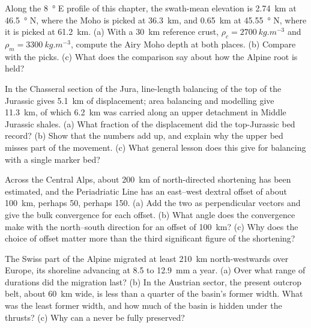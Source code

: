 \begin{exercise}[$\star\star$]\label{exo:b2:alpine-orogen:9}
Along the \qty{8}{\degree} E profile of this chapter, the swath-mean elevation is
\qty{2.74}{km} at \qty{46.5}{\degree} N, where the Moho is picked at \qty{36.3}{km}, and
\qty{0.65}{km} at \qty{45.55}{\degree} N, where it is picked at \qty{61.2}{km}. (a) With a
\qty{30}{km} reference crust, $\rho_c = \qty{2700}{kg.m^{-3}}$ and $\rho_m =
\qty{3300}{kg.m^{-3}}$, compute the Airy Moho depth at both places. (b) Compare with the
picks. (c) What does the comparison say about how the Alpine root is held?
\end{exercise}

\begin{exercise}[$\star\star\star$]\label{exo:b2:alpine-orogen:10}
In the Chasseral section of the Jura, line-length balancing of the top of the Jurassic
gives \qty{5.1}{km} of displacement; area balancing and modelling give \qty{11.3}{km}, of
which \qty{6.2}{km} was carried along an upper detachment in Middle Jurassic shales.
(a) What fraction of the displacement did the top-Jurassic bed record? (b) Show that the
numbers add up, and explain why the upper bed misses part of the movement. (c) What
general lesson does this give for balancing with a single marker bed?
\end{exercise}

\begin{exercise}[$\star\star\star$]\label{exo:b2:alpine-orogen:11}
Across the Central Alps, about \qty{200}{km} of north-directed shortening has been
estimated, and the Periadriatic Line has an east--west dextral offset of about
\qty{100}{km}, perhaps 50, perhaps 150. (a) Add the two as perpendicular vectors and give
the bulk convergence for each offset. (b) What angle does the convergence make with the
north--south direction for an offset of \qty{100}{km}? (c) Why does the choice of offset
matter more than the third significant figure of the shortening?
\end{exercise}

\begin{exercise}[$\star\star\star$]\label{exo:b2:alpine-orogen:12}
The Swiss part of the Alpine  migrated at least \qty{210}{km} north-westwards
over Europe, its shoreline advancing at 8.5 to \qty{12.9}{mm} a year. (a) Over what range of
durations did the migration last? (b) In the Austrian sector, the present outcrop belt,
about \qty{60}{km} wide, is less than a quarter of the basin's former width. What was the
least former width, and how much of the basin is hidden under the thrusts? (c) Why can a
 never be fully preserved?
\end{exercise}

